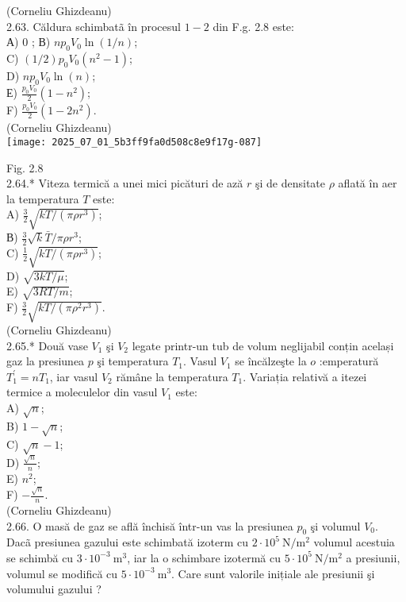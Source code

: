 (Corneliu Ghizdeanu)\\
2.63. Căldura schimbatã în procesul $1-2$ din F.g. 2.8 este:\\
А) 0 ; В) $n p_{0} V_{0} \ln (1 / n)$;\\
C) $(1 / 2) p_{0} V_{0}\left(n^{2}-1\right)$;\\
D) $n p_{0} V_{0} \ln (n)$;\\
Е) $\frac{p_{0} V_{0}}{2}\left(1-n^{2}\right)$;\\
F) $\frac{p_{0} V_{0}}{2}\left(1-2 n^{2}\right)$.\\
(Corneliu Ghizdeanu)\\
\texttt{[image: 2025\_07\_01\_5b3ff9fa0d508c8e9f17g-087]}

Fig. 2.8\\
2.64.* Viteza termică a unei mici picături de ază $r$ şi de densitate $\rho$ aflată în aer la temperatura $T$ este:\\
A) $\frac{3}{2} \sqrt{k T /\left(\pi \rho r^{3}\right)}$;\\
В) $\frac{3}{2} \sqrt{k} \bar{T} / \pi \rho r^{3}$;\\
C) $\frac{1}{2} \sqrt{k T /\left(\pi \rho r^{3}\right)}$;\\
D) $\sqrt{3 k T / \mu}$;\\
E) $\sqrt{3 R T / m}$;\\
F) $\frac{3}{2} \sqrt{k T /\left(\pi \rho^{2} r^{3}\right)}$.\\
(Corneliu Ghizdeanu)\\
2.65.* Două vase $V_{1}$ şi $V_{2}$ legate printr-un tub de volum neglijabil conțin același gaz la presiunea $p$ şi temperatura $T_{1}$. Vasul $V_{1}$ se încălzeşte la $o$ :emperatură $T_{1}^{\prime}=n T_{1}$, iar vasul $V_{2}$ rămâne la temperatura $T_{1}$. Variația relativă a itezei termice a moleculelor din vasul $V_{1}$ este:\\
A) $\sqrt{n}$;\\
B) $1-\sqrt{n}$;\\
C) $\sqrt{n}-1$;\\
D) $\frac{\sqrt{n}}{n}$;\\
E) $n^{2}$;\\
F) $-\frac{\sqrt{n}}{n}$.\\
(Corneliu Ghizdeanu)\\
2.66. O masă de gaz se află închisă într-un vas la presiunea $p_{0}$ şi volumul $V_{0}$. Dacã presiunea gazului este schimbată izoterm cu $2 \cdot 10^{5} \mathrm{~N} / \mathrm{m}^{2}$ volumul acestuia se schimbă cu $3 \cdot 10^{-3} \mathrm{~m}^{3}$, iar la o schimbare izotermă cu $5 \cdot 10^{5} \mathrm{~N} / \mathrm{m}^{2}$ a presiunii, volumul se modifică cu $5 \cdot 10^{-3} \mathrm{~m}^{3}$. Care sunt valorile inițiale ale presiunii şi volumului gazului ?\\

